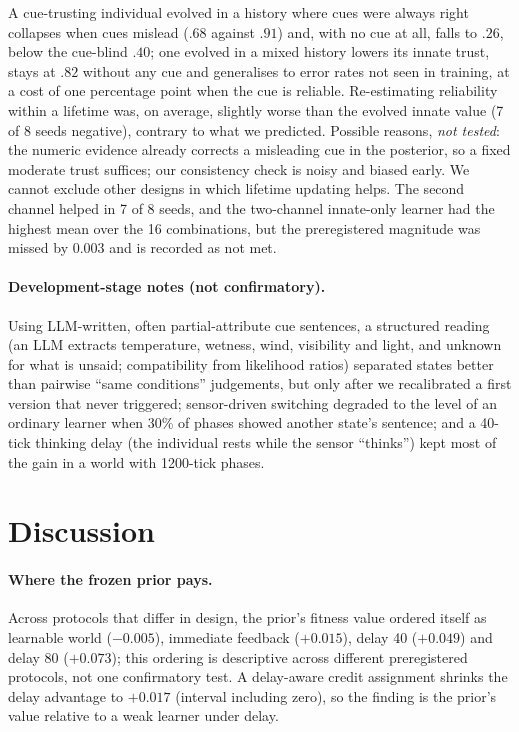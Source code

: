 \documentclass[11pt]{article}
\begin{document}
A cue-trusting individual evolved in a history where cues were always right collapses when cues mislead ($.68$ against $.91$) and, with no cue at all, falls to $.26$, below the cue-blind $.40$; one evolved in a mixed history lowers its innate trust, stays at $.82$ without any cue and generalises to error rates not seen in training, at a cost of one percentage point when the cue is reliable. Re-estimating reliability within a lifetime was, on average, slightly worse than the evolved innate value (7 of 8 seeds negative), contrary to what we predicted. Possible reasons, \emph{not tested}: the numeric evidence already corrects a misleading cue in the posterior, so a fixed moderate trust suffices; our consistency check is noisy and biased early. We cannot exclude other designs in which lifetime updating helps. The second channel helped in 7 of 8 seeds, and the two-channel innate-only learner had the highest mean over the 16 combinations, but the preregistered magnitude was missed by $0.003$ and is recorded as not met.

\paragraph{Development-stage notes (not confirmatory).} Using LLM-written, often partial-attribute cue sentences, a structured reading (an LLM extracts temperature, wetness, wind, visibility and light, and unknown for what is unsaid; compatibility from likelihood ratios) separated states better than pairwise ``same conditions'' judgements, but only after we recalibrated a first version that never triggered; sensor-driven switching degraded to the level of an ordinary learner when 30\% of phases showed another state's sentence; and a 40-tick thinking delay (the individual rests while the sensor ``thinks'') kept most of the gain in a world with 1200-tick phases.

\section{Discussion}
\paragraph{Where the frozen prior pays.} Across protocols that differ in design, the prior's fitness value ordered itself as learnable world ($-0.005$), immediate feedback ($+0.015$), delay 40 ($+0.049$) and delay 80 ($+0.073$); this ordering is descriptive across different preregistered protocols, not one confirmatory test. A delay-aware credit assignment shrinks the delay advantage to $+0.017$ (interval including zero), so the finding is the prior's value relative to a weak learner under delay.
\end{document}

